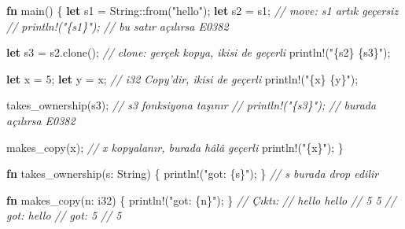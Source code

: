 \documentclass[12pt,a4paper]{article}
\newenvironment{Shaded}{}{}
\newcommand{\CommentTok}[1]{\textcolor[rgb]{0.38,0.63,0.69}{\textit{#1}}}
\newcommand{\DataTypeTok}[1]{\textcolor[rgb]{0.56,0.13,0.00}{#1}}
\newcommand{\DecValTok}[1]{\textcolor[rgb]{0.25,0.63,0.44}{#1}}
\newcommand{\FunctionTok}[1]{\textcolor[rgb]{0.02,0.16,0.49}{#1}}
\newcommand{\KeywordTok}[1]{\textcolor[rgb]{0.00,0.44,0.13}{\textbf{#1}}}
\newcommand{\NormalTok}[1]{#1}
\newcommand{\OperatorTok}[1]{\textcolor[rgb]{0.40,0.40,0.40}{#1}}
\newcommand{\StringTok}[1]{\textcolor[rgb]{0.25,0.44,0.63}{#1}}
\begin{document}
\begin{Shaded}
\begin{Highlighting}[]
\KeywordTok{fn} \FunctionTok{main}\OperatorTok{()} \OperatorTok{\{}
    \KeywordTok{let}\NormalTok{ s1 }\OperatorTok{=} \DataTypeTok{String}\OperatorTok{::}\FunctionTok{from}\OperatorTok{(}\StringTok{"hello"}\OperatorTok{);}
    \KeywordTok{let}\NormalTok{ s2 }\OperatorTok{=}\NormalTok{ s1}\OperatorTok{;}                      \CommentTok{// move: s1 artık geçersiz}
    \CommentTok{// println!("\{s1\}");              // bu satır açılırsa E0382}

    \KeywordTok{let}\NormalTok{ s3 }\OperatorTok{=}\NormalTok{ s2}\OperatorTok{.}\FunctionTok{clone}\OperatorTok{();}              \CommentTok{// clone: gerçek kopya, ikisi de geçerli}
\NormalTok{    println}\OperatorTok{!(}\StringTok{"\{s2\} \{s3\}"}\OperatorTok{);}

    \KeywordTok{let}\NormalTok{ x }\OperatorTok{=} \DecValTok{5}\OperatorTok{;}
    \KeywordTok{let}\NormalTok{ y }\OperatorTok{=}\NormalTok{ x}\OperatorTok{;}                        \CommentTok{// i32 Copy'dir, ikisi de geçerli}
\NormalTok{    println}\OperatorTok{!(}\StringTok{"\{x\} \{y\}"}\OperatorTok{);}

    \FunctionTok{takes\_ownership}\OperatorTok{(}\NormalTok{s3}\OperatorTok{);}              \CommentTok{// s3 fonksiyona taşınır}
    \CommentTok{// println!("\{s3\}");              // burada açılırsa E0382}

    \FunctionTok{makes\_copy}\OperatorTok{(}\NormalTok{x}\OperatorTok{);}                    \CommentTok{// x kopyalanır, burada hâlâ geçerli}
\NormalTok{    println}\OperatorTok{!(}\StringTok{"\{x\}"}\OperatorTok{);}
\OperatorTok{\}}

\KeywordTok{fn} \FunctionTok{takes\_ownership}\OperatorTok{(}\NormalTok{s}\OperatorTok{:} \DataTypeTok{String}\OperatorTok{)} \OperatorTok{\{}
\NormalTok{    println}\OperatorTok{!(}\StringTok{"got: \{s\}"}\OperatorTok{);}
\OperatorTok{\}}                                      \CommentTok{// s burada drop edilir}

\KeywordTok{fn} \FunctionTok{makes\_copy}\OperatorTok{(}\NormalTok{n}\OperatorTok{:} \DataTypeTok{i32}\OperatorTok{)} \OperatorTok{\{}
\NormalTok{    println}\OperatorTok{!(}\StringTok{"got: \{n\}"}\OperatorTok{);}
\OperatorTok{\}}
\CommentTok{// Çıktı:}
\CommentTok{// hello hello}
\CommentTok{// 5 5}
\CommentTok{// got: hello}
\CommentTok{// got: 5}
\CommentTok{// 5}
\end{Highlighting}
\end{Shaded}
\end{document}
